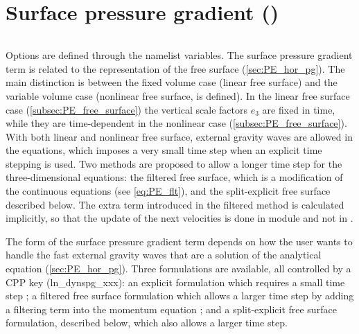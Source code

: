 \documentclass[../tex_main/NEMO_manual]{subfiles}
\begin{document}
\section{Surface pressure gradient (\protect{})}
\label{sec:DYN_spg}

$\ $\newline      %

Options are defined through the  namelist variables.
The surface pressure gradient term is related to the representation of the free surface (\autoref{sec:PE_hor_pg}). 
The main distinction is between the fixed volume case (linear free surface) and the variable volume case 
(nonlinear free surface,  is defined). In the linear free surface case (\autoref{subsec:PE_free_surface}) 
the vertical scale factors $e_{3}$ are fixed in time, while they are time-dependent in the nonlinear case 
(\autoref{subsec:PE_free_surface}). 
With both linear and nonlinear free surface, external gravity waves are allowed in the equations, 
which imposes a very small time step when an explicit time stepping is used. 
Two methods are proposed to allow a longer time step for the three-dimensional equations: 
the filtered free surface, which is a modification of the continuous equations (see \autoref{eq:PE_flt}), 
and the split-explicit free surface described below. 
The extra term introduced in the filtered method is calculated implicitly, 
so that the update of the next velocities is done in module  and not in .


The form of the surface pressure gradient term depends on how the user wants to handle 
the fast external gravity waves that are a solution of the analytical equation (\autoref{sec:PE_hor_pg}). 
Three formulations are available, all controlled by a CPP key (ln\_dynspg\_xxx):
an explicit formulation which requires a small time step ;
a filtered free surface formulation which allows a larger time step by adding a filtering 
term into the momentum equation ; 
and a split-explicit free surface formulation, described below, which also allows a larger time step.
\end{document}
